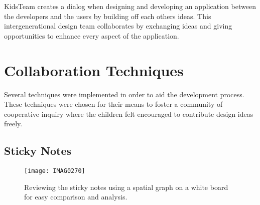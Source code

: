 
KidsTeam creates a dialog when designing and developing an application between the developers and the users by building off each others ideas. This intergenerational design team collaborates by exchanging ideas and giving opportunities to enhance every aspect of the application. 

\section{Collaboration Techniques}
Several techniques were implemented in order to aid the development process. These techniques were chosen for their means to foster a community of cooperative inquiry where the children felt encouraged to contribute design ideas freely. \cite{journalsjcalScottMI03}\cite{Colella98}


\subsection{Sticky Notes}\label{sec:stickynotes}

\begin{figure}
\centering
\texttt{[image: IMAG0270]}
\caption{Reviewing the sticky notes using a spatial graph on a white board for easy comparison and analysis. }
\label{fig:stickynotesreview}
\end{figure}


